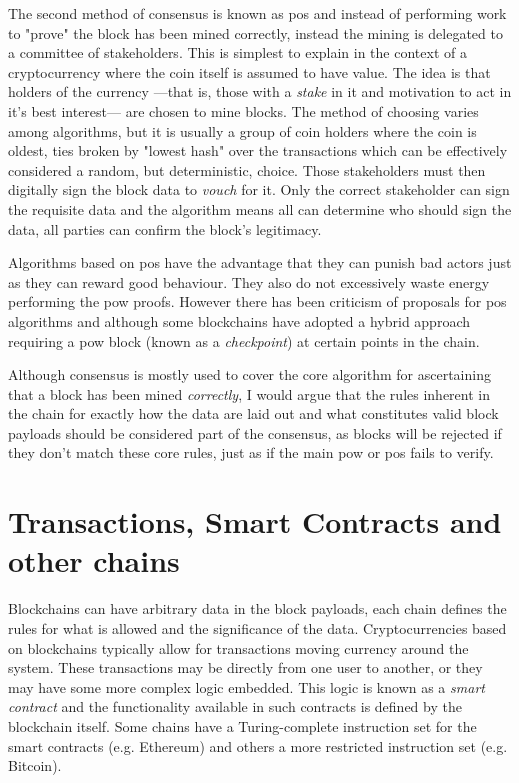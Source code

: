 The second method of consensus is known as \gls{pos} and instead of performing work to "prove" the block has been mined correctly, instead the mining is delegated to a committee of stakeholders. This is simplest to explain in the context of a cryptocurrency where the coin itself is assumed to have value. The idea is that holders of the currency ---that is, those with a \emph{stake} in it and motivation to act in it's best interest--- are chosen to mine blocks. The method of choosing varies among algorithms, but it is usually a group of coin holders where the coin is oldest, ties broken by "lowest hash" over the transactions which can be effectively considered a random, but deterministic, choice. Those stakeholders must then digitally sign the block data to \emph{vouch} for it. Only the correct stakeholder can sign the requisite data and the algorithm means all can determine who should sign the data, all parties can confirm the block's legitimacy.

Algorithms based on \gls{pos} have the advantage that they can punish bad actors just as they can reward good behaviour. They also do not excessively waste energy performing the \gls{pow} proofs. However there has been criticism of proposals for \gls{pos} algorithms  and although some blockchains  have adopted a hybrid approach requiring a \gls{pow} block (known as a \emph{checkpoint}) at certain points in the chain.

Although consensus is mostly used to cover the core algorithm for ascertaining that a block has been mined \emph{correctly}, I would argue that the rules inherent in the chain for exactly how the data are laid out and what constitutes valid block payloads should be considered part of the consensus, as blocks will be rejected if they don't match these core rules, just as if the main \gls{pow} or \gls{pos} fails to verify.

\section{Transactions, Smart Contracts and other chains}
\label{ch:blockchain:types}

Blockchains can have arbitrary data in the block payloads, each chain defines the rules for what is allowed and the significance of the data. Cryptocurrencies based on blockchains typically allow for transactions moving currency around the system. These transactions may be directly from one user to another, or they may have some more complex logic embedded. This logic is known as a \emph{smart contract} and the functionality available in such contracts is defined by the blockchain itself. Some chains have a Turing-complete instruction set for the smart contracts (e.g. Ethereum) and others a more restricted instruction set (e.g. Bitcoin).


